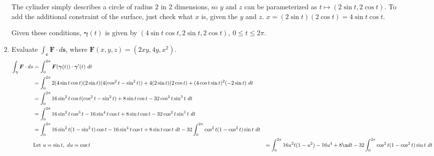 \documentclass{article}
\newcommand{\gam}{\boldsymbol{\gamma}}
\begin{document}
\begin{enumerate}
\begin{enumerate}
                The cylinder simply describes a circle of radius $2$ in 2 dimensions, so $y$ and $z$ can be parameterized as $t \mapsto (2 \sin t, 2 \cos t)$. To add the additional constraint of the surface, just check what $x$ is, given the $y$ and $z$. $x = (2\sin t)(2\cos t) = 4\sin t \cos t$.
               
                Given these conditions, $\gam(t)$ is given by $(4 \sin t \cos t, 2 \sin t, 2 \cos t), \: 0 \leq t \leq 2\pi$.
            \item Evaluate $\displaystyle \int_{\boldsymbol{c}} \boldsymbol{F} \cdot d \boldsymbol{s}$, where $\boldsymbol{F}(x,y,z) = (2xy,4y,x^2)$.
                \begin{align*}
                    \int_{\gam} \boldsymbol{F} \cdot ds &= \int^{2\pi}_0 \boldsymbol{F}(\gam(t)) \cdot \gam'(t) \ dt \\
                    &= \int^{2\pi}_0 2(4 \sin t \cos t)(2 \sin t)(4 (\cos^2t-\sin^2t)) + 4 (2 \sin t)( 2 \cos t) + (4 \cos t \sin t)^2(-2\sin t) \ dt \\
                    &= \int^{2\pi}_0 16\sin^2 t \cos t(\cos^2t-\sin^2t) + 8\sin t \cos t - 32 \cos^2 t \sin^3 t \ dt \\
                    &= \int^{2\pi}_0 16\sin^2 t \cos^3 t - 16 \sin^4t \cos t + 8\sin t \cos t - 32 \cos^2 t \sin^3 t \ dt \\
                    &= \int^{2\pi}_0 16\sin^2 t (1 - \sin^2 t) \cos t - 16 \sin^4t \cos t + 8\sin t \cos t \ dt - 32\int_0^{2\pi} \cos^2 t (1 - \cos^2 t)\sin t \ dt \\
                    &\text{Let }u = \sin t, \ du = \cos t
                    &= \int^{2\pi}_0 16 u^2 t (1 - u^2) - 16 u^4 + 8\u dt - 32\int_0^{2\pi} \cos^2 t (1 - \cos^2 t)\sin t \ dt \\
                \end{align*}
        \end{enumerate}
\end{enumerate}
\end{document}
